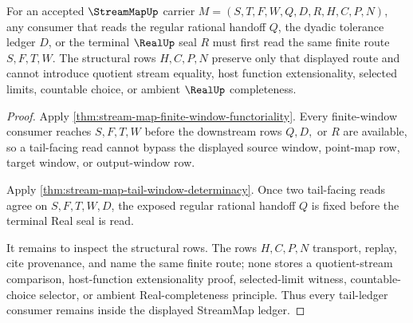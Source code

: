 \begin{theorem}
\label{thm:stream-map-tail-ledger-nonescape}
For an accepted $\StreamMapUp$ carrier $M=(S,T,F,W,Q,D,R,H,C,P,N)$, any consumer that reads the regular rational handoff $Q$, the dyadic tolerance ledger $D$, or the terminal $\RealUp$ seal $R$ must first read the same finite route $S,F,T,W$. The structural rows $H,C,P,N$ preserve only that displayed route and cannot introduce quotient stream equality, host function extensionality, selected limits, countable choice, or ambient $\RealUp$ completeness.
\end{theorem}
\begin{proof}
Apply \autoref{thm:stream-map-finite-window-functoriality}. Every finite-window consumer reaches $S,F,T,W$ before the downstream rows $Q,D,$ or $R$ are available, so a tail-facing read cannot bypass the displayed source window, point-map row, target window, or output-window row.

Apply \autoref{thm:stream-map-tail-window-determinacy}. Once two tail-facing reads agree on $S,F,T,W,D$, the exposed regular rational handoff $Q$ is fixed before the terminal Real seal is read.

It remains to inspect the structural rows. The rows $H,C,P,N$ transport, replay, cite provenance, and name the same finite route; none stores a quotient-stream comparison, host-function extensionality proof, selected-limit witness, countable-choice selector, or ambient Real-completeness principle. Thus every tail-ledger consumer remains inside the displayed StreamMap ledger.
\end{proof}

